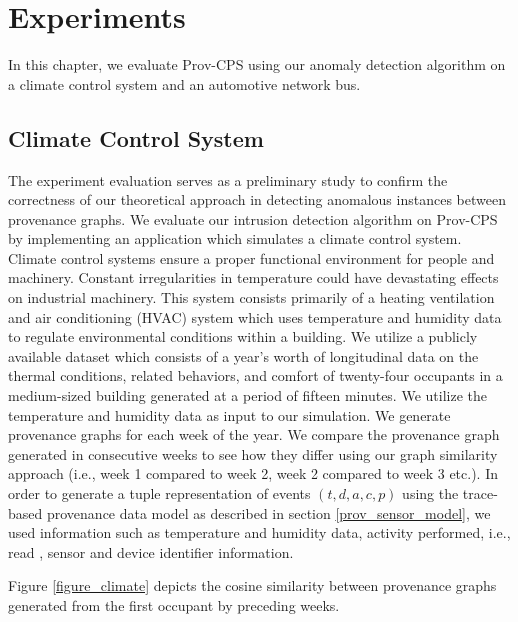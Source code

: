 
\chapter{Experiments}

In this chapter, we evaluate Prov-CPS using our anomaly detection algorithm on a climate control system and an automotive network bus.

\section{Climate Control System}
The experiment evaluation serves as a preliminary study to confirm the correctness of our theoretical approach in detecting anomalous instances between provenance graphs. We evaluate our intrusion detection algorithm on Prov-CPS by implementing an application which simulates a climate control system. Climate control systems ensure a proper functional environment for people and machinery. Constant irregularities in temperature could have devastating effects on industrial machinery. This system consists primarily of a heating ventilation and air conditioning (HVAC) system which uses temperature and humidity data to regulate environmental conditions within a building. We utilize a publicly available dataset \cite{LANGEVIN201594} which consists of a year's worth of longitudinal data on the thermal conditions, related behaviors, and comfort of twenty-four occupants in a medium-sized building generated at  a period of fifteen minutes. We utilize the temperature and humidity data as input to our simulation. We generate provenance graphs for each week of the year. We compare the provenance graph generated in consecutive weeks to see how they differ using our graph similarity approach (i.e., week 1 compared to week 2, week 2 compared to week 3 etc.). In order to generate a tuple representation of events $(t, d, a, c, p)$ using the trace-based provenance data model as described in section \ref{prov_sensor_model}, we used information such as temperature and humidity data, activity performed, i.e., read , sensor and device identifier information.
\par Figure \ref{figure_climate} depicts the cosine similarity between provenance graphs generated from the first occupant by preceding weeks. 


